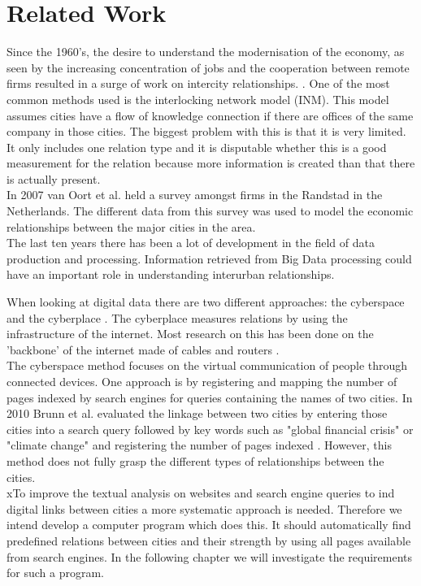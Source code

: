 \section{Related Work}
Since the 1960's, the desire to understand the modernisation of the economy, as seen by the increasing concentration of jobs and the cooperation between remote firms resulted in a surge of work on intercity relationships. \cite{tornqvist1968flows}.
One of the most common methods used is the interlocking network model (INM)\cite{taylor2012interlocking}. This model assumes cities have a flow of knowledge connection if there are offices of the same company in those cities. The biggest problem with this is that it is very limited. It only includes one relation type and it is disputable whether this is a good measurement for the relation because more information is created than that there is actually present. \\
In 2007 van Oort et al. \cite{van2010economic} held a survey amongst firms in the Randstad in the Netherlands. The different data from this survey was used to model the economic relationships between the major cities in the area. \\

The last ten years there has been a lot of development in the field of data production and processing. Information retrieved from Big Data processing could have an important role in understanding interurban relationships.

When looking at digital data there are two different approaches: the cyberspace and the cyberplace \cite{devriendt2008cyberplace}. The cyberplace measures relations by using the infrastructure of the internet. Most research on this has been done on the 'backbone' of the internet made of cables and routers \cite{choi2006comparing, gorman2000networks}. \\

The cyberspace method focuses on the virtual communication of people through connected devices. One approach is by registering and mapping the number of pages indexed by search engines for queries containing the names of two cities\cite{devriendt2008cyberplace, janc2015visibility, janc2015geography}. In 2010 Brunn et al. evaluated the linkage between two cities by entering those cities into a search query followed by key words such as "global financial crisis" or "climate change" and registering the number of pages indexed \cite{brunn2010networks}. However, this method does not fully grasp the different types of relationships between the cities. \\

xTo improve the textual analysis on websites and search engine queries to ind digital links between cities a more systematic approach is needed.  Therefore we intend develop a computer program which does this. It should automatically find predefined relations between cities and their strength by using all pages available from search engines. In the following chapter we will investigate the requirements for such a program.
